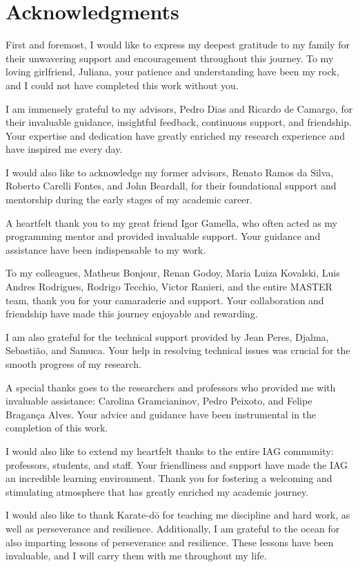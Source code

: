 \section*{Acknowledgments}

First and foremost, I would like to express my deepest gratitude to my family for their unwavering support and encouragement throughout this journey. To my loving girlfriend, Juliana, your patience and understanding have been my rock, and I could not have completed this work without you.

I am immensely grateful to my advisors, Pedro Dias and Ricardo de Camargo, for their invaluable guidance, insightful feedback, continuous support, and friendship. Your expertise and dedication have greatly enriched my research experience and have inspired me every day.

I would also like to acknowledge my former advisors, Renato Ramos da Silva, Roberto Carelli Fontes, and John Beardall, for their foundational support and mentorship during the early stages of my academic career.

A heartfelt thank you to my great friend Igor Gamella, who often acted as my programming mentor and provided invaluable support. Your guidance and assistance have been indispensable to my work.

To my colleagues, Matheus Bonjour, Renan Godoy, Maria Luiza Kovalski, Luis Andres Rodrigues, Rodrigo Tecchio, Victor Ranieri, and the entire MASTER team, thank you for your camaraderie and support. Your collaboration and friendship have made this journey enjoyable and rewarding.

I am also grateful for the technical support provided by Jean Peres, Djalma, Sebastião, and Samuca. Your help in resolving technical issues was crucial for the smooth progress of my research.

A special thanks goes to the researchers and professors who provided me with invaluable assistance: Carolina Gramcianinov, Pedro Peixoto, and Felipe Bragança Alves. Your advice and guidance have been instrumental in the completion of this work.

I would also like to extend my heartfelt thanks to the entire IAG community: professors, students, and staff. Your friendliness and support have made the IAG an incredible learning environment. Thank you for fostering a welcoming and stimulating atmosphere that has greatly enriched my academic journey.

I would also like to thank Karate-dō for teaching me discipline and hard work, as well as perseverance and resilience. Additionally, I am grateful to the ocean for also imparting lessons of perseverance and resilience. These lessons have been invaluable, and I will carry them with me throughout my life.

